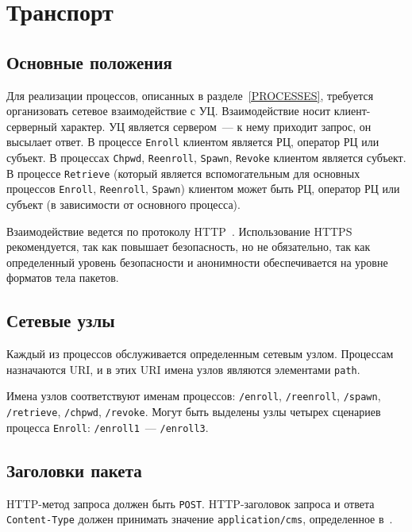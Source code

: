 \chapter{Транспорт}\label{TRANSPORT}

\section{Основные положения}\label{TRANSPORT.Common}

Для реализации процессов, описанных в разделе~\ref{PROCESSES}, требуется
организовать сетевое взаимодействие с УЦ. Взаимодействие носит
клиент-серверный характер. УЦ является сервером~--- к нему приходит запрос,
он высылает ответ. В процессе  \texttt{Enroll} клиентом является РЦ,
оператор РЦ или субъект. В процессах \texttt{Chpwd}, \texttt{Reenroll},
\texttt{Spawn}, \texttt{Revoke} клиентом является субъект. В процессе
\texttt{Retrieve} (который является вспомогательным для основных процессов
\texttt{Enroll}, \texttt{Reenroll}, \texttt{Spawn}) клиентом может быть РЦ,
оператор РЦ или субъект (в зависимости от основного процесса).

Взаимодействие ведется по протоколу HTTP~\cite{HTTP}.
Использование HTTPS рекомендуется, так как повышает безопасность,
но не обязательно, так как определенный уровень безопасности и анонимности
обеспечивается на уровне форматов тела пакетов.

\section{Сетевые узлы}\label{TRANSPORT.Endpoints}

Каждый из процессов обслуживается определенным сетевым узлом.
Процессам назначаются URI, и в этих URI имена узлов являются
элементами \texttt{path}.

Имена узлов соответствуют именам процессов: 
\texttt{/enroll},
\texttt{/reenroll},
\texttt{/spawn},
\texttt{/retrieve},
\texttt{/chpwd},
\texttt{/revoke}.
%
Могут быть выделены узлы четырех сценариев процесса \texttt{Enroll}:
\texttt{/enroll1}~--- \texttt{/enroll3}.

\section{Заголовки пакета}\label{TRANSPORT.Headers}

HTTP-метод запроса должен быть \texttt{POST}.
HTTP-заголовок запроса и ответа \texttt{Content-Type} должен принимать
значение \texttt{application/cms}, определенное в~\cite{ContentTypeCms}. 

